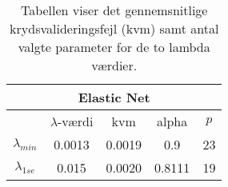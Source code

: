 \begin{table}
\center
\begin{tabular}{ccccc}
\toprule
\multicolumn{5}{c}{Elastic Net} \\ \midrule
 & $\lambda$-værdi & kvm & alpha & $p$ \\ 
 $\lambda_{min}$ & 0.0013 & 0.0019 & 0.9 & 23  \\ 
 $\lambda_{1se}$ & 0.015 & 0.0020 & 0.8111 & 19 \\ \bottomrule
\end{tabular}
\caption{Tabellen viser det gennemsnitlige krydsvalideringsfejl (kvm) samt antal valgte parameter for de to lambda værdier.  } \label{tab:cv_el1}
\end{table}